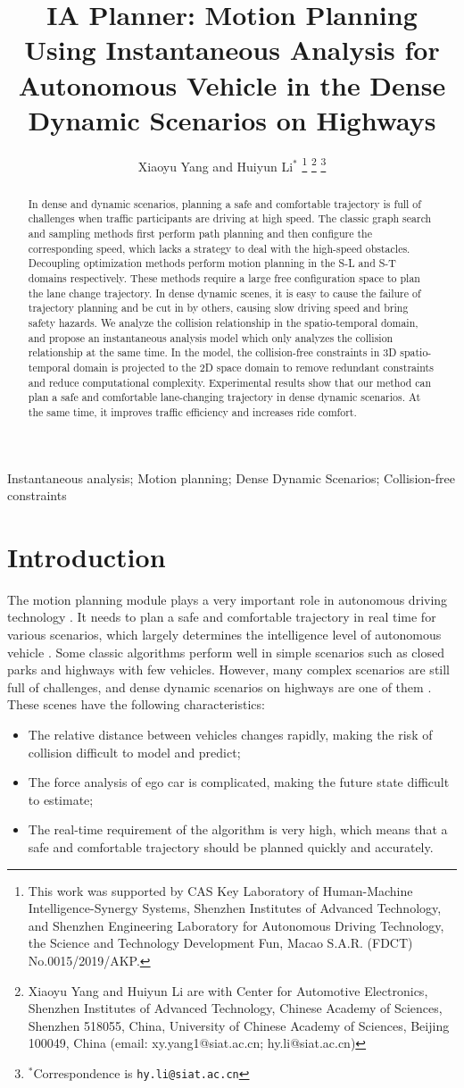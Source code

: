 \documentclass[conference]{IEEEtran}
\title{IA Planner: Motion Planning Using Instantaneous Analysis for Autonomous Vehicle in the Dense Dynamic Scenarios on Highways}
\author{Xiaoyu Yang and Huiyun Li$^{*}$%
	\thanks{This work was supported by CAS Key Laboratory of Human-Machine Intelligence-Synergy Systems, Shenzhen Institutes of Advanced Technology, and Shenzhen Engineering Laboratory for Autonomous Driving Technology, the Science and Technology Development Fun, Macao S.A.R. (FDCT) No.0015/2019/AKP.}%
	\thanks{Xiaoyu Yang and Huiyun Li are with Center for Automotive Electronics, Shenzhen Institutes of Advanced Technology, Chinese Academy of Sciences, Shenzhen 518055, China, University of Chinese Academy of Sciences, Beijing 100049, China (email: xy.yang1@siat.ac.cn; hy.li@siat.ac.cn)}%
	\thanks{$^{*}$Correspondence is {\tt\small hy.li@siat.ac.cn}}%
}
\begin{document}
\maketitle

\begin{abstract}
In dense and dynamic scenarios, planning a safe and comfortable trajectory is full of challenges when traffic participants are driving at high speed.	The classic graph search and sampling methods first perform path planning and then configure the corresponding speed, which lacks a strategy to deal with the high-speed obstacles. Decoupling optimization methods perform motion planning in the S-L and S-T domains respectively. These methods require a large free configuration space to plan the lane change trajectory. In dense dynamic scenes, it is easy to cause the failure of trajectory planning and be cut in by others, causing slow driving speed and bring safety hazards. We analyze the collision relationship in the spatio-temporal domain, and propose an instantaneous analysis model which only analyzes the collision relationship at the same time. In the model, the collision-free constraints in 3D spatio-temporal domain is projected to the 2D space domain to remove redundant constraints and reduce computational complexity. Experimental results show that our method can plan a safe and comfortable lane-changing trajectory in dense dynamic scenarios. At the same time, it improves traffic efficiency and increases ride comfort.
\end{abstract}
\begin{IEEEkeywords}
      Instantaneous analysis; Motion planning; Dense Dynamic Scenarios; Collision-free constraints
\end{IEEEkeywords}

\IEEEpeerreviewmaketitle


\section{Introduction}
The motion planning module plays a very important role in autonomous driving technology \cite{7339478}. It needs to plan a safe and comfortable trajectory in real time for various scenarios, which largely determines the intelligence level of autonomous vehicle \cite{schwarting2018planning}. Some classic algorithms perform well in simple scenarios such as closed parks and highways with few vehicles. However, many complex scenarios are still full of challenges, and dense dynamic scenarios on highways are one of them \cite{8715479}. These scenes have the following characteristics:
\begin{itemize}
	\item The relative distance between vehicles changes rapidly, making the risk of collision difficult to model and predict;	
	\item The force analysis of ego car is complicated, making the future state difficult to estimate; 
	\item The real-time requirement of the algorithm is very high, which means that a safe and comfortable trajectory should be planned quickly and accurately.
\end{itemize}
\end{document}
